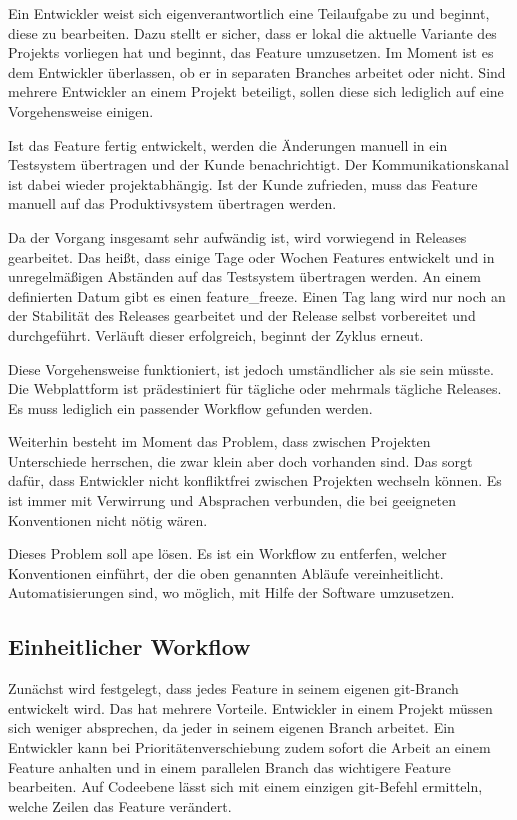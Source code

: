Ein Entwickler weist sich eigenverantwortlich eine Teilaufgabe zu und beginnt, diese zu bearbeiten. Dazu stellt er sicher, dass er lokal die aktuelle Variante des Projekts vorliegen hat und beginnt, das Feature umzusetzen. Im Moment ist es dem Entwickler überlassen, ob er in separaten Branches arbeitet oder nicht. Sind mehrere Entwickler an einem Projekt beteiligt, sollen diese sich lediglich auf eine Vorgehensweise einigen.

Ist das Feature fertig entwickelt, werden die Änderungen manuell in ein Testsystem übertragen und der Kunde benachrichtigt. Der Kommunikationskanal ist dabei wieder projektabhängig. Ist der Kunde zufrieden, muss das Feature manuell auf das Produktivsystem übertragen werden.

Da der Vorgang insgesamt sehr aufwändig ist, wird vorwiegend in Releases gearbeitet. Das heißt, dass einige Tage oder Wochen Features entwickelt und in unregelmäßigen Abständen auf das Testsystem übertragen werden. An einem definierten Datum gibt es einen \gls{feature_freeze}. Einen Tag lang wird nur noch an der Stabilität des Releases gearbeitet und der Release selbst vorbereitet und durchgeführt. Verläuft dieser erfolgreich, beginnt der Zyklus erneut.

Diese Vorgehensweise funktioniert, ist jedoch umständlicher als sie sein müsste. Die Webplattform ist prädestiniert für tägliche oder mehrmals tägliche Releases. Es muss lediglich ein passender Workflow gefunden werden.

Weiterhin besteht im Moment das Problem, dass zwischen Projekten Unterschiede herrschen, die zwar klein aber doch vorhanden sind. Das sorgt dafür, dass Entwickler nicht konfliktfrei zwischen Projekten wechseln können. Es ist immer mit Verwirrung und Absprachen verbunden, die bei geeigneten Konventionen nicht nötig wären.

Dieses Problem soll \gls{ape} lösen. Es ist ein Workflow zu entferfen, welcher Konventionen einführt, der die oben genannten Abläufe vereinheitlicht. Automatisierungen sind, wo möglich, mit Hilfe der Software umzusetzen.


\subsection{Einheitlicher Workflow} %
\label{sub:einheitlicher_workflow}

Zunächst wird festgelegt, dass jedes Feature in seinem eigenen \gls{git}-Branch entwickelt wird. Das hat mehrere Vorteile. Entwickler in einem Projekt müssen sich weniger absprechen, da jeder in seinem eigenen Branch arbeitet. Ein Entwickler kann bei Prioritätenverschiebung zudem sofort die Arbeit an einem Feature anhalten und in einem parallelen Branch das wichtigere Feature bearbeiten. Auf Codeebene lässt sich mit einem einzigen \gls{git}-Befehl ermitteln, welche Zeilen das Feature verändert.

